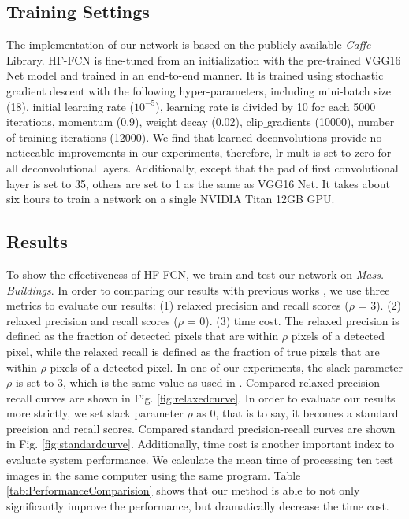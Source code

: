 \documentclass[runningheads]{llncs}
\begin{document}
\subsection{Training Settings}
   The implementation of our network is based on the publicly  available \textit{Caffe} \cite{Jia2014Caffe} Library. HF-FCN is fine-tuned from an initialization with the pre-trained VGG16 Net model and trained in an end-to-end manner. It is trained using stochastic gradient descent with the following hyper-parameters, including mini-batch size (18), initial learning rate ($10^{-5}$), learning rate is divided by 10 for each 5000 iterations, momentum (0.9), weight decay (0.02), clip$\_$gradients (10000), number of training iterations (12000). We find that learned deconvolutions provide no noticeable improvements in our experiments, therefore,  lr$\_$mult is set to zero for all deconvolutional layers. Additionally, except that the pad of first convolutional layer is set to 35, others are set to 1 as the  same as VGG16 Net. It takes about six hours to train a network on a single NVIDIA Titan 12GB GPU.

\subsection{Results}
    To show the effectiveness of HF-FCN, we train and test our network on \textit{Mass. Buildings}. In order to comparing our results with previous works \cite{Mnih2013Machine,Saito2016Multiple}, we use three metrics to evaluate our results: (1) relaxed precision and recall scores ($\rho$ = 3). (2) relaxed precision and recall scores ($\rho$ = 0). (3) time cost.  The relaxed precision is defined as the fraction of detected pixels that are within $\rho$ pixels of a detected pixel, while the relaxed recall is defined as the fraction of true pixels that are within $\rho$ pixels of a detected pixel.  In  one of our experiments, the slack parameter $\rho$ is set to 3, which is the same value as used in \cite{Mnih2013Machine,Saito2016Multiple}. Compared relaxed precision-recall curves are shown in  Fig. \ref{fig:relaxedcurve}. In order to evaluate our results more strictly, we set slack parameter $\rho$ as 0, that is to say, it becomes a standard precision and recall scores. Compared standard precision-recall curves are shown in  Fig. \ref{fig:standardcurve}. Additionally, time cost is another important index to evaluate system performance. We calculate the mean time of processing ten test images in the same computer using the same program. Table \ref{tab:PerformanceComparision} shows that our method is able to not only significantly improve the performance, but dramatically decrease the time cost. 
      
\end{document}
